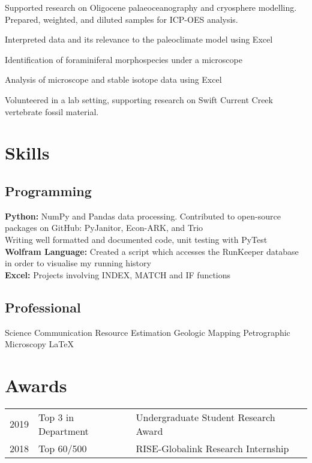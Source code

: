 \documentclass[]{deedy-resume-openfont}
\begin{document}
Supported research on Oligocene palaeoceanography and cryosphere modelling. Prepared, weighted, and diluted samples for ICP-OES analysis. 
\begin{tightemize}
\item Interpreted data and its relevance to the paleoclimate model using Excel
\item Identification of foraminiferal morphospecies under a microscope \item Analysis of microscope and stable isotope data using Excel 
\end{tightemize}
\sectionsep

Volunteered in a lab setting, supporting research on Swift Current Creek vertebrate fossil material.
\sectionsep


%
%
\section{Skills} 

\subsection{Programming}

\textbf{Python:} NumPy and Pandas data processing. Contributed to open-source packages on GitHub: PyJanitor, Econ-ARK, and Trio \\
Writing well formatted and documented code, unit testing with PyTest \\
\textbf{Wolfram Language:} Created a script which accesses the RunKeeper database in order to visualise my running history \\
\textbf{Excel:} Projects involving INDEX, MATCH and IF functions 
\sectionsep


\subsection{Professional}
Science Communication \textbullet{} Resource Estimation \textbullet{} Geologic Mapping \textbullet{} Petrographic Microscopy  \textbullet{}  \LaTeX 
\sectionsep


\section{Awards} 
\begin{tabular}{rll}
2019		&  Top 3 in Department & Undergraduate Student Research Award \\
2018		&  Top 60/500  & RISE-Globalink Research Internship \\
 \end{tabular}
\sectionsep
\end{document}
